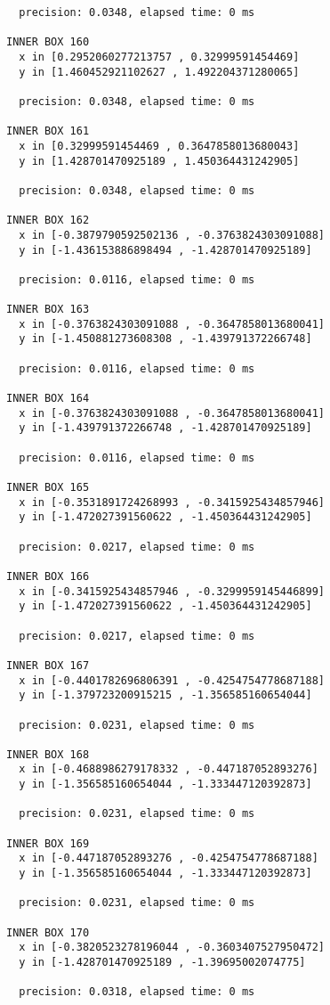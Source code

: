\begin{verbatim}
  precision: 0.0348, elapsed time: 0 ms

INNER BOX 160
  x in [0.2952060277213757 , 0.32999591454469]
  y in [1.460452921102627 , 1.492204371280065]

  precision: 0.0348, elapsed time: 0 ms

INNER BOX 161
  x in [0.32999591454469 , 0.3647858013680043]
  y in [1.428701470925189 , 1.450364431242905]

  precision: 0.0348, elapsed time: 0 ms

INNER BOX 162
  x in [-0.3879790592502136 , -0.3763824303091088]
  y in [-1.436153886898494 , -1.428701470925189]

  precision: 0.0116, elapsed time: 0 ms

INNER BOX 163
  x in [-0.3763824303091088 , -0.3647858013680041]
  y in [-1.450881273608308 , -1.439791372266748]

  precision: 0.0116, elapsed time: 0 ms

INNER BOX 164
  x in [-0.3763824303091088 , -0.3647858013680041]
  y in [-1.439791372266748 , -1.428701470925189]

  precision: 0.0116, elapsed time: 0 ms

INNER BOX 165
  x in [-0.3531891724268993 , -0.3415925434857946]
  y in [-1.472027391560622 , -1.450364431242905]

  precision: 0.0217, elapsed time: 0 ms

INNER BOX 166
  x in [-0.3415925434857946 , -0.3299959145446899]
  y in [-1.472027391560622 , -1.450364431242905]

  precision: 0.0217, elapsed time: 0 ms

INNER BOX 167
  x in [-0.4401782696806391 , -0.4254754778687188]
  y in [-1.379723200915215 , -1.356585160654044]

  precision: 0.0231, elapsed time: 0 ms

INNER BOX 168
  x in [-0.4688986279178332 , -0.447187052893276]
  y in [-1.356585160654044 , -1.333447120392873]

  precision: 0.0231, elapsed time: 0 ms

INNER BOX 169
  x in [-0.447187052893276 , -0.4254754778687188]
  y in [-1.356585160654044 , -1.333447120392873]

  precision: 0.0231, elapsed time: 0 ms

INNER BOX 170
  x in [-0.3820523278196044 , -0.3603407527950472]
  y in [-1.428701470925189 , -1.39695002074775]

  precision: 0.0318, elapsed time: 0 ms


\end{verbatim}
